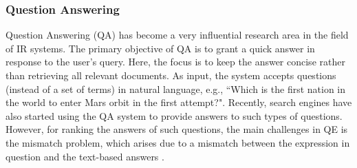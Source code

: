 \subsubsection{Question Answering}\label{QA}
Question Answering (QA) has become a very influential research area in the field of IR systems. The primary objective of QA is to grant a quick answer in response to the user's query. Here, the focus is to keep the answer concise rather than retrieving all relevant documents. As input, the system accepts questions (instead of a set of terms) in natural language, e.g., ``Which is the first nation in the world to enter Mars orbit in the first attempt?". Recently, search engines have also started using the QA system to provide answers to such types of questions. However, for ranking the answers of such questions, the main challenges in QE is the mismatch problem, which arises due to a mismatch between the expression in question and the text-based answers \cite{lin2001discovery}.

